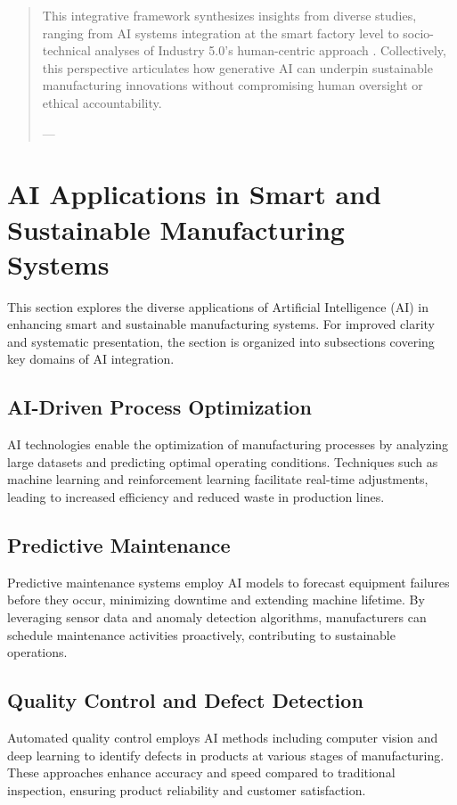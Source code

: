\documentclass[sigconf]{acmart}
\begin{document}
\begin{abstract}
This integrative framework synthesizes insights from diverse studies, ranging from AI systems integration at the smart factory level \cite{ref11} to socio-technical analyses of Industry 5.0’s human-centric approach \cite{ref19}. Collectively, this perspective articulates how generative AI can underpin sustainable manufacturing innovations without compromising human oversight or ethical accountability.

---
\end{abstract}

\maketitle

\section{AI Applications in Smart and Sustainable Manufacturing Systems}

This section explores the diverse applications of Artificial Intelligence (AI) in enhancing smart and sustainable manufacturing systems. For improved clarity and systematic presentation, the section is organized into subsections covering key domains of AI integration.

\subsection{AI-Driven Process Optimization}
AI technologies enable the optimization of manufacturing processes by analyzing large datasets and predicting optimal operating conditions. Techniques such as machine learning and reinforcement learning facilitate real-time adjustments, leading to increased efficiency and reduced waste in production lines.

\subsection{Predictive Maintenance}
Predictive maintenance systems employ AI models to forecast equipment failures before they occur, minimizing downtime and extending machine lifetime. By leveraging sensor data and anomaly detection algorithms, manufacturers can schedule maintenance activities proactively, contributing to sustainable operations.

\subsection{Quality Control and Defect Detection}
Automated quality control employs AI methods including computer vision and deep learning to identify defects in products at various stages of manufacturing. These approaches enhance accuracy and speed compared to traditional inspection, ensuring product reliability and customer satisfaction.
\end{document}
